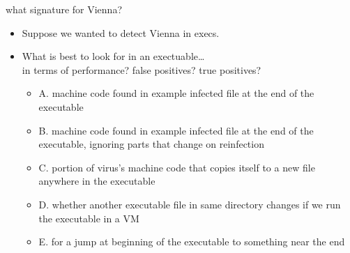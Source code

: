 \begin{frame}{what signature for Vienna?}
    \begin{itemize}
    \item Suppose we wanted to detect Vienna in execs.
    \item What is best to look for in an exectuable\ldots \\
        in terms of performance? false positives? true positives?
        \begin{itemize}
        \item A. machine code found in example infected file at the end of the executable 
        \item B. machine code found in example infected file at the end of the executable, ignoring parts that change on reinfection
        \item C. portion of virus's machine code that copies itself to a new file anywhere in the executable
        \item D. whether another executable file in same directory changes if we run the executable in a VM
        \item E. for a jump at beginning of the executable to something near the end
        \end{itemize}
    \end{itemize}
\end{frame}
